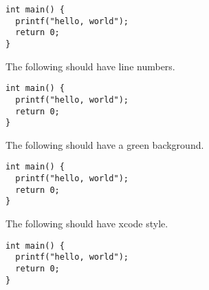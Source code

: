 \documentclass{article}
\begin{document}
\begin{verbatim}
int main() {
  printf("hello, world");
  return 0;
}
\end{verbatim}

The following should have line numbers.

\begin{verbatim}
int main() {
  printf("hello, world");
  return 0;
}
\end{verbatim}

The following should have a green background.

\begin{verbatim}
int main() {
  printf("hello, world");
  return 0;
}
\end{verbatim}

The following should have xcode style.

\begin{verbatim}
int main() {
  printf("hello, world");
  return 0;
}
\end{verbatim}
\end{document}
